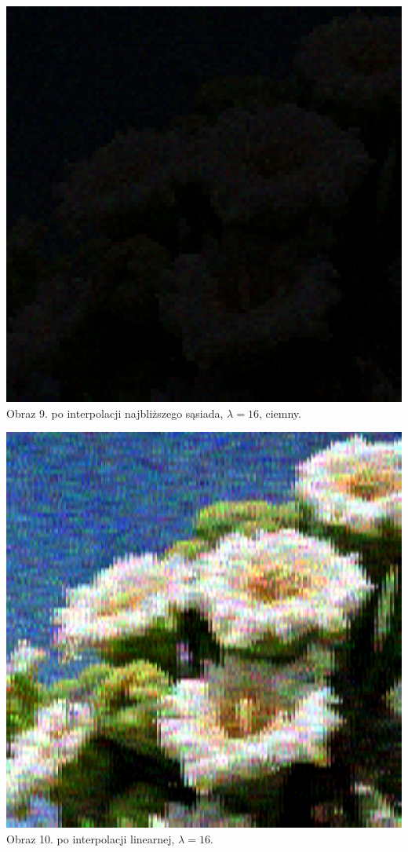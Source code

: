 \documentclass[14pt]{article}
\begin{document}
\begin{center}
    \vspace{0.5cm}
    \includegraphics[scale=0.15]{images/Poisson_nearest_dark_16x.jpg}
    \\ \small Obraz 9. po interpolacji najbliższego sąsiada, 
    $\lambda = 16$, ciemny.

    \vspace{0.5cm}
    \includegraphics[scale=0.15]{images/Poisson_bilinear_16x.jpg}
    \\ \small Obraz 10. po interpolacji linearnej, 
    $\lambda = 16$.


\end{center}
\end{document}
